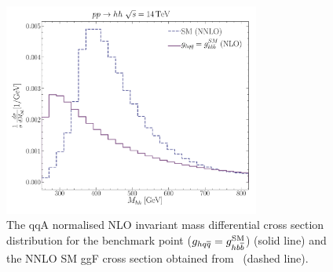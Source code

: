 \begin{figure}[!b]
	\centering
	\includegraphics[width = 0.75\textwidth]{./fig/uh_shnnlo_shape.pdf}
	\caption{The qqA normalised NLO invariant mass differential cross section distribution for the benchmark point ($g_{hq \overline q} = g_{h b \overline b}^{\mathrm{SM}}$) (solid line) and the NNLO SM ggF cross section obtained from~\cite{Grazzini:2018bsd} (dashed line).
	}
	\label{qqA_dsigdmhh}
\end{figure}

